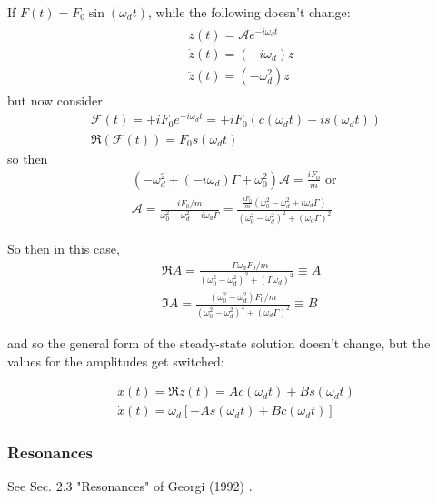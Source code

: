 If $F(t) = F_0 \sin{(\omega_d t)}$, while the following doesn't change:
\[
\begin{gathered}
\begin{aligned}
& z(t) = \mathcal{A} e^{-i\omega_d t} \\
& \dot{z}(t) = (-i \omega_d) z \\
& \ddot{z}(t) = (-\omega_d^2)z
\end{aligned}
\end{gathered}
\]
but now consider 
\[
\begin{gathered}
\mathcal{F}(t) = + i F_0 e^{-i\omega_d t} = +i F_0 (c(\omega_d t)  -i s(\omega_d t) ) \\
\Re{(\mathcal{F}(t) )} = F_0 s(\omega_dt)
\end{gathered}
\]
so then
\[
\begin{gathered}
	(-\omega_d^2 + (-i \omega_d)\Gamma + \omega_0^2)\mathcal{A} = \frac{iF_0}{m}  \text{ or } 	\\
	\mathcal{A} = \frac{ iF_0 / m }{ \omega_0^2 - \omega_d^2- i\omega_d \Gamma} = \frac{ \frac{iF_0}{m} (\omega_0^2 - \omega_d^2 + i \omega_d \Gamma  )}{ (\omega_0^2 - \omega_d^2)^2 + (\omega_d \Gamma)^2 }
\end{gathered}
\]

So then in this case, 
\begin{equation}\label{agat:Eq:AmplitudeValuesForcedOscillationsForceProportionalToSine:2}
\begin{aligned}
& \Re{A} = \frac{ -\Gamma \omega_d F_0 /m }{ (\omega_0^2 - \omega_d^2)^2 + (\Gamma \omega_d )^2 } \equiv A \\
& \Im{A} = \frac{ (\omega_0^2 - \omega_d^2) F_0/m }{(\omega_0^2 - \omega_d^2)^2 + (\omega_d \Gamma)^2} \equiv B 
\end{aligned}
\end{equation}

and so the general form of the steady-state solution doesn't change, but the values for the amplitudes get switched:

\[
\begin{gathered}
x(t) = \Re{ z(t)} = Ac(\omega_d t) + Bs(\omega_dt) \\
\dot{x}(t) = \omega_d \left[ -A s(\omega_dt) + Bc(\omega_dt) \right]
\end{gathered}
\]

\subsubsection{Resonances} See Sec. 2.3 "Resonances" of Georgi (1992) \cite{agat:Geor1992}.

